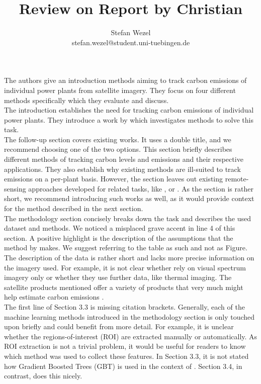 \documentclass{article} %
\title{Review on Report by Christian \vspace{0.5cm}}
\author{Stefan Wezel \\ stefan.wezel@student.uni-tuebingen.de}
\def\figwidth{.5\linewidth}
\def\figheight{.15\textheight}
\begin{document}
\maketitle
The authors give an introduction methods aiming to track carbon emissions of individual power plants from satellite imagery. They focus on four different methods specifically which they evaluate and discuss.\\
The introduction establishes the need for tracking carbon emissions of individual power plants. They introduce a work by \citet{couture2020towards} which investigates methods to solve this task.\\
The follow-up section covers existing works. It uses a double title, and we recommend choosing one of the two options. This section briefly describes different methods of tracking carbon levels and emissions and their respective applications. They also establish why existing methods are ill-suited to track emissions on a per-plant basis. However, the section leaves out existing remote-sensing approaches developed for related tasks, like \citet{isaev2002using, duren2012measuring, ouyang2017effect}, or \citet{cui2018land}. As the section is rather short, we recommend introducing such works as well, as it would provide context for the method described in the next section.\\
The methodology section concisely breaks down the task and describes the used dataset and methods. We noticed a misplaced grave accent in line 4 of this section. A positive highlight is the description of the assumptions that the method by \citet{couture2020towards} makes. We suggest referring to the table as such and not as Figure.\\
The description of the data is rather short and lacks more precise information on the imagery used. For example, it is not clear whether \citet{couture2020towards} rely on visual spectrum imagery only or whether they use further data, like thermal imaging. The satellite products mentioned offer a variety of products that very much might help estimate carbon emissions \cite{gatti2013sentinel, roy2014landsat}.\\
The first line of Section 3.3 is missing citation brackets. Generally, each of the machine learning methods introduced in the methodology section is only touched upon briefly and could benefit from more detail. For example, it is unclear whether the regions-of-interest (ROI) are extracted manually or automatically. As ROI extraction is not a trivial problem, it would be useful for readers to know which method was used to collect these features. In Section 3.3, it is not stated how Gradient Boosted Trees (GBT) is used in the context of \citet{couture2020towards}. Section 3.4, in contrast, does this nicely.\\
\end{document}
